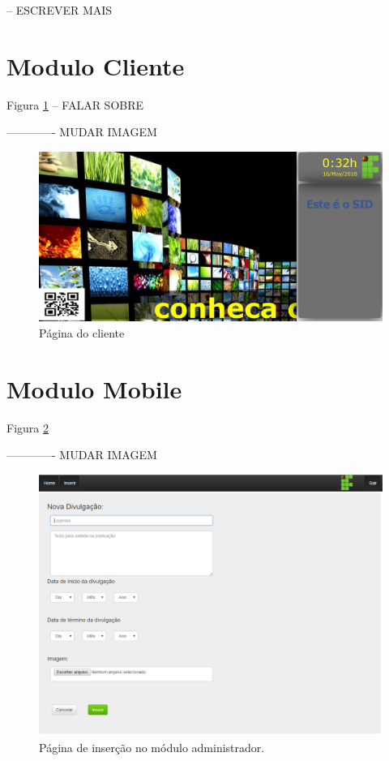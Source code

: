 -- ESCREVER MAIS

\section{Modulo Cliente}
Figura \ref{fig:cliente1}
-- FALAR SOBRE

 ------------- MUDAR IMAGEM
\begin{figure}[H]
\centering
\includegraphics[scale=0.4]{figuras/cliente1}
\caption{Página do cliente}
\label{fig:cliente1}
\end{figure}


\section{Modulo Mobile}
Figura \ref{fig:mobile1}

 ------------- MUDAR IMAGEM
\begin{figure}[H]
\centering
\includegraphics[scale=0.6]{figuras/administrador1}
\caption{Página de inserção no módulo administrador.}
\label{fig:mobile1}
\end{figure}


